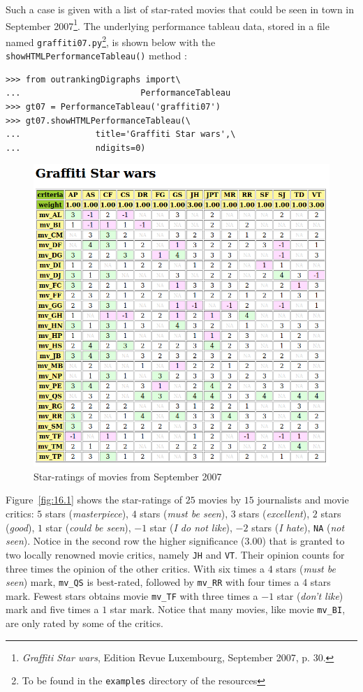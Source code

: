 Such a case is given with a list of star-rated movies that could be seen in town in September 2007\footnote{\emph{Graffiti Star wars}, Edition Revue Luxembourg, September 2007, p. 30.}. The underlying performance tableau data, stored in a file named \texttt{graffiti07.py}\footnote{To be found in the \texttt{examples} directory of the \Digraph resources}, is shown below with the \texttt{showHTMLPerformance\-Tableau()} method  : 
\begin{lstlisting}
>>> from outrankingDigraphs import\
...                        PerformanceTableau 
>>> gt07 = PerformanceTableau('graffiti07')
>>> gt07.showHTMLPerformanceTableau(\
...               title='Graffiti Star wars',\
...               ndigits=0)
\end{lstlisting}
\begin{figure}[ht]
\includegraphics[width=0.9\hsize]{Figures/16-1-graffiti07_1.png}
\caption{Star-ratings of movies from September 2007}
\label{fig:16.1}       %
\end{figure}

Figure~\vref{fig:16.1} shows the star-ratings of $25$ movies by $15$ journalists and movie critics: $5$ stars (\emph{masterpiece}), $4$ stars (\emph{must be seen}), $3$ stars (\emph{excellent}), $2$ stars (\emph{good}), $1$ star (\emph{could be seen}), $-1$ star (\emph{I do not like}), $-2$ stars (\emph{I hate}), \texttt{NA} (\emph{not seen}). Notice in the second row the higher significance ($3.00$) that is granted to two locally renowned movie critics, namely \texttt{JH} and \texttt{VT}. Their opinion counts for three times the opinion of the other critics. With six times a 4 stars (\emph{must be seen}) mark, \texttt{mv\_QS} is best-rated, followed by \texttt{mv\_RR} with four times a 4 stars mark. Fewest stars obtains movie \texttt{mv\_TF} with three times a $-1$ star (\emph{don't like}) mark and five times a $1$ star mark. Notice that many movies, like movie \texttt{mv\_BI}, are only rated by some of the critics. 

